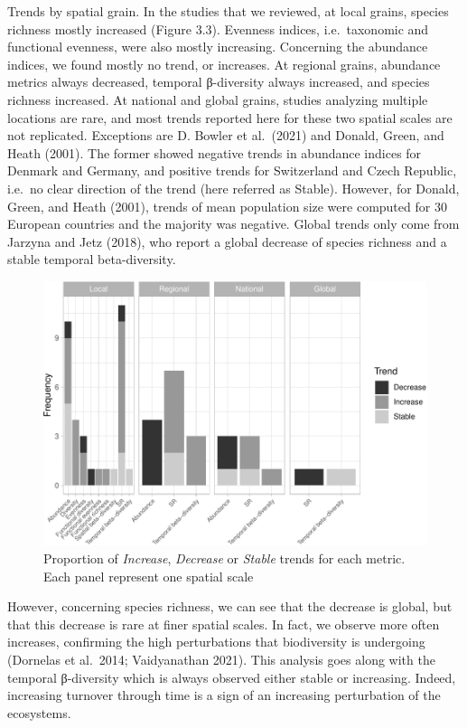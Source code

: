 \documentclass[
  12pt,
  oneside]{report}
\begin{document}
Trends by spatial grain. In the studies that we reviewed, at local grains, species richness mostly increased (Figure 3.3). Evenness indices, i.e.~taxonomic and functional evenness, were also mostly increasing. Concerning the abundance indices, we found mostly no trend, or increases. At regional grains, abundance metrics always decreased, temporal β-diversity always increased, and species richness increased. At national and global grains, studies analyzing multiple locations are rare, and most trends reported here for these two spatial scales are not replicated. Exceptions are D. Bowler et al.~(2021) and Donald, Green, and Heath (2001). The former showed negative trends in abundance indices for Denmark and Germany, and positive trends for Switzerland and Czech Republic, i.e.~no clear direction of the trend (here referred as Stable). However, for Donald, Green, and Heath (2001), trends of mean population size were computed for 30 European countries and the majority was negative. Global trends only come from Jarzyna and Jetz (2018), who report a global decrease of species richness and a stable temporal beta-diversity.

\begin{figure}
\centering
\includegraphics{literature_review_files/figure-latex/barmetricsperspatscale-1.pdf}
\caption{\label{fig:barmetricsperspatscale}Proportion of \emph{Increase}, \emph{Decrease} or \emph{Stable} trends for each metric. Each panel represent one spatial scale}
\end{figure}

However, concerning species richness, we can see that the decrease is global, but that this decrease is rare at finer spatial scales. In fact, we observe more often increases, confirming the high perturbations that biodiversity is undergoing (Dornelas et al.~2014; Vaidyanathan 2021). This analysis goes along with the temporal β-diversity which is always observed either stable or increasing. Indeed, increasing turnover through time is a sign of an increasing perturbation of the ecosystems.
\end{document}
